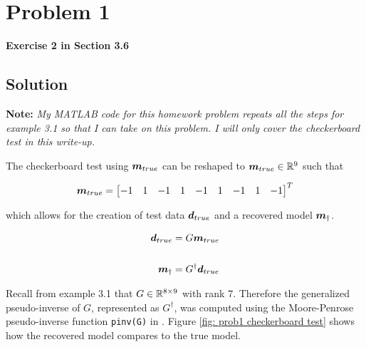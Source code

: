 
\begingroup
\allowdisplaybreaks

\newpage
\section{Problem 1}

\textbf{Exercise 2 in Section 3.6}

\subsection{Solution}
	
\textbf{Note: } \textit{My MATLAB code for this homework problem repeats all the steps for example 3.1 so that I can take on this problem. I will only cover the checkerboard test in this write-up.}
\newline

The checkerboard test using $\boldsymbol{m}_{true}$ can be reshaped to $\boldsymbol{m}_{true} \in \mathbb{R}^9$ such that

\begin{align*}
	\boldsymbol{m}_{true} = \begin{bmatrix}
		-1 & 1 & -1 & 1 & -1 & 1 & -1 & 1 & -1
	\end{bmatrix}^T
\end{align*}

which allows for the creation of test data $\boldsymbol{d}_{true}$ and a recovered model $\boldsymbol{m}_{\dagger}$.

\begin{align*}
	\boldsymbol{d}_{true} &= G \boldsymbol{m}_{true} \\
	\\
	\boldsymbol{m}_{\dagger} &= G^{\dagger} \boldsymbol{d}_{true}
\end{align*}

Recall from example 3.1 that $G \in \mathbb{R}^{8 \times 9}$ with rank $7$. Therefore the generalized pseudo-inverse of $G$, represented as $G^{\dagger}$, was computed using the Moore-Penrose pseudo-inverse function \verb*|pinv(G)| in \MATLAB. Figure \ref{fig: prob1 checkerboard test} shows how the recovered model compares to the true model. 

